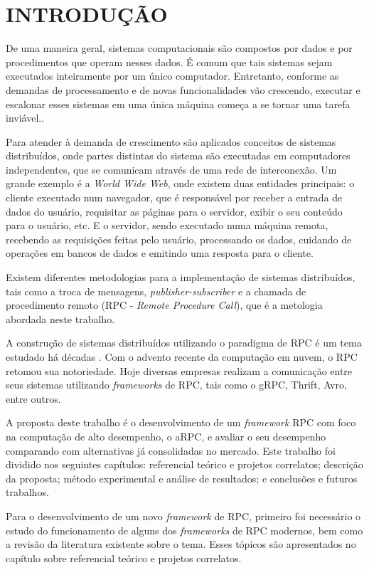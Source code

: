 \chapter{INTRODUÇÃO}

De uma maneira geral, sistemas computacionais são compostos por dados e por procedimentos que operam nesses dados. É comum que tais sistemas sejam executados inteiramente por um único computador. Entretanto, conforme as demandas de processamento e de novas funcionalidades vão crescendo, executar e escalonar esses sistemas em uma única máquina começa a se tornar uma tarefa inviável.\cite{ord_neuman_scale_1994}. 

Para atender à demanda de crescimento são aplicados conceitos de sistemas distribuídos, onde partes distintas do sistema são executadas em computadores independentes, que se comunicam através de uma rede de interconexão. Um grande exemplo é a \textit{World Wide Web}, onde existem duas entidades principais: o cliente executado num navegador, que é responsável por receber a entrada de dados do usuário, requisitar as páginas para o servidor, exibir o seu conteúdo para o usuário, etc. E o servidor, sendo executado numa máquina remota, recebendo as requisições feitas pelo usuário, processando os dados, cuidando de operações em bancos de dados e emitindo uma resposta para o cliente.

Existem diferentes metodologias para a implementação de sistemas distribuídos, tais como a troca de mensagens, \textit{publisher-subscriber} e a chamada de procedimento remoto (RPC - \textit{Remote Procedure Call}), que é a metologia abordada neste trabalho.

A construção de sistemas distribuídos utilizando o paradigma de RPC é um tema estudado há décadas \cite{nelson_remote_1981}. Com o advento recente da computação em nuvem, o RPC retomou sua notoriedade. Hoje diversas empresas realizam a comunicação entre seus sistemas utilizando \textit{frameworks} de RPC, tais como o gRPC, Thrift, Avro, entre outros.

A proposta deste trabalho é o desenvolvimento de um \textit{framework} RPC com foco na computação de alto desempenho, o aRPC, e avaliar o seu desempenho comparando com alternativas já consolidadas no mercado. Este trabalho foi dividido nos seguintes capítulos: referencial teórico e projetos correlatos; descrição da proposta; método experimental e análise de resultados; e conclusões e futuros trabalhos. 

Para o desenvolvimento de um novo \textit{framework} de RPC, primeiro foi necessário o estudo do funcionamento de alguns dos \textit{frameworks} de RPC modernos, bem como a revisão da literatura existente sobre o tema. Esses tópicos são apresentados no capítulo sobre referencial teórico e projetos correlatos.

